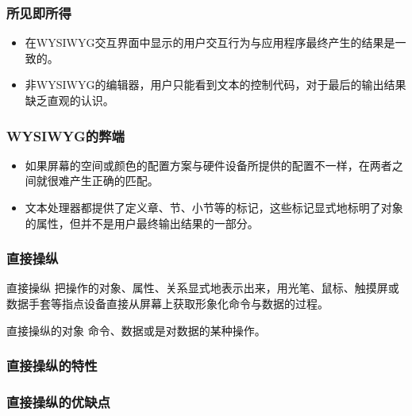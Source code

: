 \documentclass{beamer}
\begin{document}
\begin{frame}
	\frametitle{所见即所得}
	\begin{itemize}
		\item 在WYSIWYG交互界面中显示的用户交互行为与应用程序最终产生的结果是一致的。 
		\item 非WYSIWYG的编辑器，用户只能看到文本的控制代码，对于最后的输出结果缺乏直观的认识。
	\end{itemize}
\end{frame}

\begin{frame}
	\frametitle{WYSIWYG的弊端}
	\begin{itemize}
		\item 如果屏幕的空间或颜色的配置方案与硬件设备所提供的配置不一样，在两者之间就很难产生正确的匹配。
		\item 文本处理器都提供了定义章、节、小节等的标记，这些标记显式地标明了对象的属性，但并不是用户最终输出结果的一部分。
	\end{itemize}
\end{frame}

\begin{frame}
	\frametitle{直接操纵}
	\beamertemplatetransparentcovereddynamicmedium
	\begin{beamerboxesrounded}[shadow=true]{直接操纵}
	把操作的对象、属性、关系显式地表示出来，用光笔、鼠标、触摸屏或数据手套等指点设备直接从屏幕上获取形象化命令与数据的过程。
	\end{beamerboxesrounded}
	\pause
	\begin{beamerboxesrounded}[shadow=true]{直接操纵的对象}
	命令、数据或是对数据的某种操作。
	\end{beamerboxesrounded}
\end{frame}

\begin{frame}
	\frametitle{直接操纵的特性}

\end{frame}

\begin{frame}
	\frametitle{直接操纵的优缺点}

\end{frame}
\end{document}
